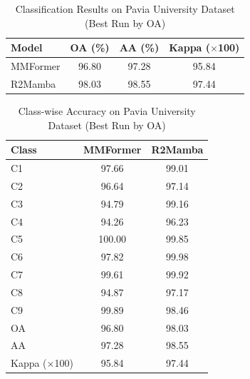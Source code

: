 
\begin{table}[htbp]
\centering
\caption{Classification Results on Pavia University Dataset (Best Run by OA)}
\label{tab:pavia university_results_arranged}
\begin{tabular}{lccc}
\toprule
Model & OA (\%) & AA (\%) & Kappa ($\times$100) \\
\midrule
MMFormer & 96.80 & 97.28 & 95.84 \\
R2Mamba & 98.03 & 98.55 & 97.44 \\
\bottomrule
\end{tabular}
\end{table}

\begin{table}[htbp]
\centering
\caption{Class-wise Accuracy on Pavia University Dataset (Best Run by OA)}
\label{tab:pavia university_classwise_arranged}
\begin{tabular}{lcc}
\toprule
Class & MMFormer & R2Mamba \\
\midrule
C1 & 97.66 & 99.01 \\
C2 & 96.64 & 97.14 \\
C3 & 94.79 & 99.16 \\
C4 & 94.26 & 96.23 \\
C5 & 100.00 & 99.85 \\
C6 & 97.82 & 99.98 \\
C7 & 99.61 & 99.92 \\
C8 & 94.87 & 97.17 \\
C9 & 99.89 & 98.46 \\
\midrule
OA & 96.80 & 98.03 \\
AA & 97.28 & 98.55 \\
Kappa ($\times$100) & 95.84 & 97.44 \\
\bottomrule
\end{tabular}
\end{table}